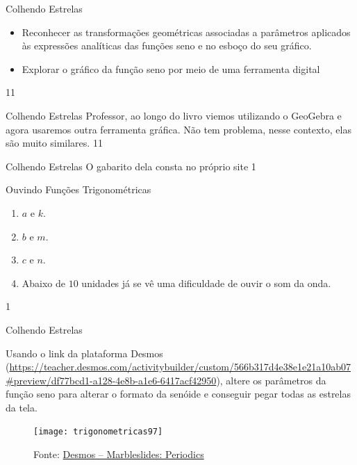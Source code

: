 \label{trig-prac4}
\begin{objectives}{Colhendo Estrelas}
{
\begin{itemize}
\item Reconhecer as transformações geométricas associadas a
parâmetros aplicados às expressões analíticas das funções
seno e no esboço do seu gráfico.
\item Explorar o gráfico da função seno por meio de uma
ferramenta digital
\end{itemize}
}{1}{1}
\end{objectives}
\begin{sugestions}{Colhendo Estrelas}
{
Professor, ao longo do livro viemos utilizando o GeoGebra e
agora usaremos outra ferramenta gráfica. Não tem problema,
nesse contexto, elas são muito similares.
}{1}{1}
\end{sugestions}
\begin{answer}{Colhendo Estrelas}
{
O gabarito dela consta no próprio site
}{1}
\end{answer}
\clearmargin
\begin{answer}{Ouvindo Funções Trigonométricas}
{
\begin{enumerate}
\item $a$ e $k$.
\item $b$ e $m$.
\item $c$ e $n$.
\item Abaixo de $10$ unidades já se vê uma dificuldade de ouvir o som da onda.
\end{enumerate}
}{1}
\end{answer}


\begin{task}{Colhendo Estrelas}
\label{trig-ativ19}

Usando o link da plataforma Desmos (\url{https://teacher.desmos.com/activitybuilder/custom/566b317d4e38e1e21a10ab07\#preview/df77bcd1-a128-4e8b-a1e6-6417acf42950}), altere os parâmetros da função seno para alterar o formato da senóide e conseguir pegar todas as estrelas da tela.

\begin{figure}[H]
\centering

\texttt{[image: trigonometricas97]}
\caption{Fonte: \href{https://teacher.desmos.com/activitybuilder/custom/566b317d4e38e1e21a10ab07\#preview/df77bcd1-a128-4e8b-a1e6-6417acf42950}{Desmos -- Marbleslides: Periodics}}
\label{}
\end{figure}

\end{task}

